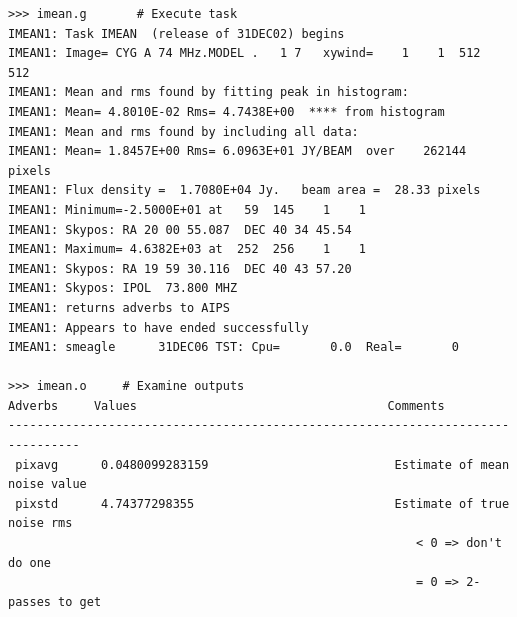 \documentclass[11pt]{report}
\begin{document}
\begin{verbatim}
>>> imean.g       # Execute task
IMEAN1: Task IMEAN  (release of 31DEC02) begins
IMEAN1: Image= CYG A 74 MHz.MODEL .   1 7   xywind=    1    1  512  512
IMEAN1: Mean and rms found by fitting peak in histogram:
IMEAN1: Mean= 4.8010E-02 Rms= 4.7438E+00  **** from histogram
IMEAN1: Mean and rms found by including all data:
IMEAN1: Mean= 1.8457E+00 Rms= 6.0963E+01 JY/BEAM  over    262144 pixels
IMEAN1: Flux density =  1.7080E+04 Jy.   beam area =  28.33 pixels
IMEAN1: Minimum=-2.5000E+01 at   59  145    1    1
IMEAN1: Skypos: RA 20 00 55.087  DEC 40 34 45.54
IMEAN1: Maximum= 4.6382E+03 at  252  256    1    1
IMEAN1: Skypos: RA 19 59 30.116  DEC 40 43 57.20
IMEAN1: Skypos: IPOL  73.800 MHZ
IMEAN1: returns adverbs to AIPS
IMEAN1: Appears to have ended successfully
IMEAN1: smeagle      31DEC06 TST: Cpu=       0.0  Real=       0

>>> imean.o     # Examine outputs
Adverbs     Values                                   Comments
--------------------------------------------------------------------------------
 pixavg      0.0480099283159                          Estimate of mean noise value
 pixstd      4.74377298355                            Estimate of true noise rms
                                                         < 0 => don't do one
                                                         = 0 => 2-passes to get
\end{verbatim}
\end{document}
